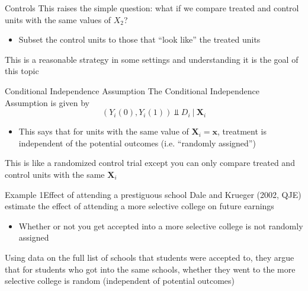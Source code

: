\documentclass[aspectratio=169,t,11pt,table]{beamer}
\begin{document}
\begin{frame}{Controls}
  This raises the simple question: what if we compare treated and control units with the same values of $X_2$?
  \begin{itemize}
    \item Subset the control units to those that ``look like'' the treated units
  \end{itemize}

  \pause
  \bigskip
  This is a reasonable strategy in some settings and understanding it is the goal of this topic
\end{frame}

\begin{frame}{Conditional Independence Assumption}
  The \alert{Conditional Independence Assumption} is given by
  $$
    (Y_{i}(0), Y_{i}(1)) \Perp D_i \ \vert \ \bm{X}_i
  $$
  \begin{itemize}
    \item This says that for units with the same value of $\bm{X}_i = \bm{x}$, treatment is independent of the potential outcomes (i.e. ``randomly assigned'')
  \end{itemize}

  \pause
  \bigskip
  This is like a randomized control trial except you can only compare treated and control units with the same $\bm{X}_i$
\end{frame}

\begin{frame}{Example 1}{Effect of attending a prestiguous school}
  Dale and Krueger (2002, QJE) estimate the effect of attending a more selective college on future earnings
  \begin{itemize}
    \item Whether or not you get accepted into a more selective college is not randomly assigned
  \end{itemize}

  \pause
  \bigskip
  Using data on the full list of schools that students were accepted to, they argue that for students who got into the same schools, whether they went to the more selective college is random (independent of potential outcomes)
\end{frame}
\end{document}
